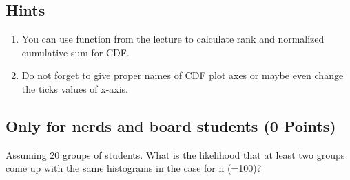 \documentclass{WeSTassignment}
\begin{document}
\subsection{Hints}
\begin{enumerate}
\item You can use function from the lecture to calculate rank and normalized cumulative sum for CDF.
\item Do not forget to give proper names of CDF plot axes or maybe even change the ticks values of x-axis. 
\end{enumerate}

\subsection{Only for nerds and board students (0 Points)}
Assuming 20 groups of students. What is the likelihood that at least two groups come up with the same histograms in the case for n (=100)?





\makefooter
\end{document}
